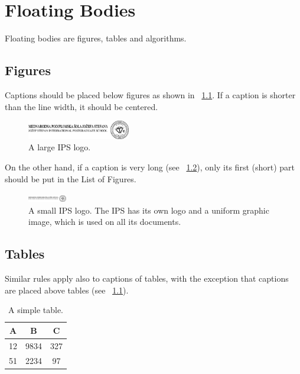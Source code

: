 % 
\chapter{Floating Bodies}

Floating bodies are figures, tables and algorithms. 

\section{Figures}

Captions should be placed below figures as shown in \figurename~\ref{fig:ips-short}. If a caption is shorter than the line width, it should be centered. 

\begin{figure}[htb]
	\centering
		\includegraphics[width=0.4\textwidth]{figures/ipslogo-cut.pdf}
	\caption{A large IPS logo.}
	\label{fig:ips-short}
\end{figure}

On the other hand, if a caption is very long (see \figurename~\ref{fig:ips-long}), only its first (short) part should be put in the List of Figures. 

\begin{figure}[htb]
	\centering
		\includegraphics[width=0.15\textwidth]{figures/ipslogo-cut.pdf}
	\caption[A small IPS logo.]{A small IPS logo. The IPS has its own logo and a uniform graphic image, which is used on all its documents.}
	\label{fig:ips-long}
\end{figure}

\section{Tables}

Similar rules apply also to captions of tables, with the exception that captions are placed above tables (see \tablename~\ref{tab:example}).

\begin{table}[htb]
	\caption{A simple table.}
	\label{tab:example}
	\centering
		\begin{tabular}{ccc}
			\hline
			A & B & C \\
			\hline
			12 & 9834 & 327 \\
			51 & 2234 & 97 \\
			\hline
		\end{tabular}
\end{table}

